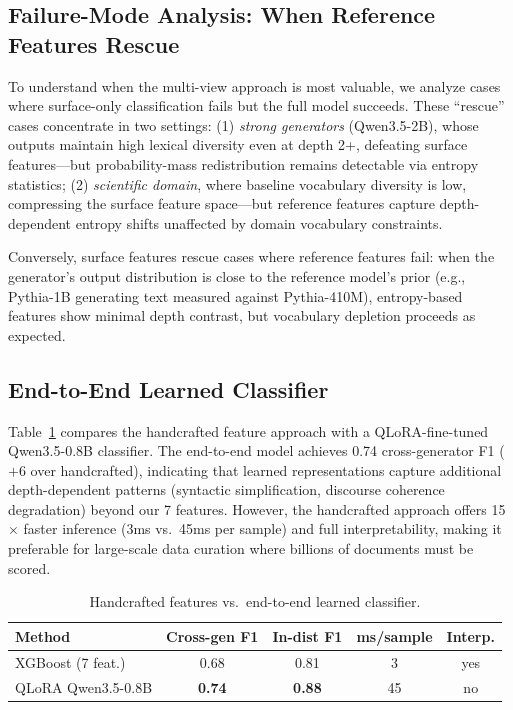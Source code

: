\documentclass[letterpaper,11pt]{article}
\begin{document}
\subsection{Failure-Mode Analysis: When Reference Features Rescue}
\label{sec:failure}

To understand when the multi-view approach is most valuable, we analyze cases where surface-only classification fails but the full model succeeds. These ``rescue'' cases concentrate in two settings: (1) \emph{strong generators} (Qwen3.5-2B), whose outputs maintain high lexical diversity even at depth 2+, defeating surface features---but probability-mass redistribution remains detectable via entropy statistics; (2) \emph{scientific domain}, where baseline vocabulary diversity is low, compressing the surface feature space---but reference features capture depth-dependent entropy shifts unaffected by domain vocabulary constraints.

Conversely, surface features rescue cases where reference features fail: when the generator's output distribution is close to the reference model's prior (e.g., Pythia-1B generating text measured against Pythia-410M), entropy-based features show minimal depth contrast, but vocabulary depletion proceeds as expected.

\subsection{End-to-End Learned Classifier}
\label{sec:e2e}

Table~\ref{tab:e2e} compares the handcrafted feature approach with a QLoRA-fine-tuned Qwen3.5-0.8B classifier. The end-to-end model achieves 0.74 cross-generator F1 ($+$6 over handcrafted), indicating that learned representations capture additional depth-dependent patterns (syntactic simplification, discourse coherence degradation) beyond our 7 features. However, the handcrafted approach offers 15$\times$ faster inference (3ms vs.\ 45ms per sample) and full interpretability, making it preferable for large-scale data curation where billions of documents must be scored.

\begin{table}[t]
\centering
\caption{Handcrafted features vs.\ end-to-end learned classifier.}
\label{tab:e2e}
\small
\begin{tabular}{lcccc}
\toprule
Method & Cross-gen F1 & In-dist F1 & ms/sample & Interp. \\
\midrule
XGBoost (7 feat.) & 0.68 & 0.81 & 3 & yes \\
QLoRA Qwen3.5-0.8B & \textbf{0.74} & \textbf{0.88} & 45 & no \\
\bottomrule
\end{tabular}
\end{table}
\end{document}
